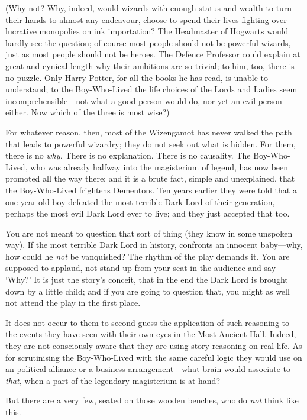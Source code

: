 (Why not? Why, indeed, would wizards with enough status and wealth to
turn their hands to almost any endeavour, choose to spend their lives
fighting over lucrative monopolies on ink importation? The Headmaster of
Hogwarts would hardly see the question; of course most people should not
be powerful wizards, just as most people should not be heroes. The
Defence Professor could explain at great and cynical length why their
ambitions are so trivial; to him, too, there is no puzzle. Only Harry
Potter, for all the books he has read, is unable to understand; to the
Boy-Who-Lived the life choices of the Lords and Ladies seem
incomprehensible---not what a good person would do, nor yet an evil
person either. Now which of the three is most wise?)

For whatever reason, then, most of the Wizengamot has never walked the
path that leads to powerful wizardry; they do not seek out what is
hidden. For them, there is no \emph{why.} There is no explanation. There
is no causality. The Boy-Who-Lived, who was already halfway into the
magisterium of legend, has now been promoted all the way there; and it
is a brute fact, simple and unexplained, that the Boy-Who-Lived
frightens Dementors. Ten years earlier they were told that a
one-year-old boy defeated the most terrible Dark Lord of their
generation, perhaps the most evil Dark Lord ever to live; and they just
accepted that too.

You are not meant to question that sort of thing (they know in some
unspoken way). If the most terrible Dark Lord in history, confronts an
innocent baby---why, how could he \emph{not} be vanquished? The rhythm
of the play demands it. You are supposed to applaud, not stand up from
your seat in the audience and say `Why?' It is just the story's conceit,
that in the end the Dark Lord is brought down by a little child; and if
you are going to question that, you might as well not attend the play in
the first place.

It does not occur to them to second-guess the application of such
reasoning to the events they have seen with their own eyes in the Most
Ancient Hall. Indeed, they are not consciously aware that they are using
story-reasoning on real life. As for scrutinising the Boy-Who-Lived with
the same careful logic they would use on an political alliance or a
business arrangement---what brain would associate to \emph{that,} when a
part of the legendary magisterium is at hand?

But there are a very few, seated on those wooden benches, who do
\emph{not} think like this.

